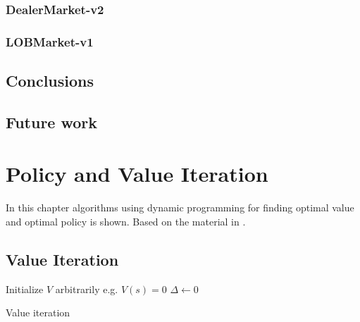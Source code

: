 \documentclass{kththesis}
\theoremstyle{definition}
\begin{document}
\subsection*{DealerMarket-v2}


\subsection*{LOBMarket-v1}

\section{Conclusions}

\section{Future work}

\printbibliography[heading=bibintoc] %

\appendix 


\chapter{Policy and Value Iteration}\label{app:A}
In this chapter algorithms using dynamic programming for finding optimal value and optimal policy is shown. Based on the material in \parencite{sutton1998reinforcement}.

\section{Value Iteration}
\LinesNumbered
\begin{algorithm}[H]
 \textsf{Initialize $V$ arbitrarily e.g. $V(s) = 0$} \;
 $\Delta \leftarrow 0$ \;
 \caption{Value iteration}
 \label{alg2}
\end{algorithm}
\end{document}
